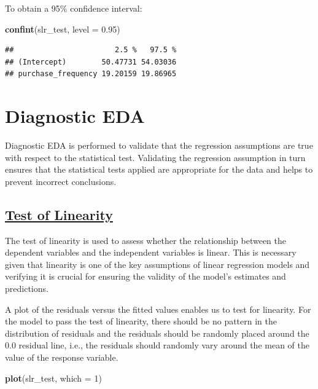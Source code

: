 \documentclass[
]{article}
\newenvironment{Shaded}{\begin{snugshade}}{\end{snugshade}}
\newcommand{\AttributeTok}[1]{\textcolor[rgb]{0.13,0.29,0.53}{#1}}
\newcommand{\DecValTok}[1]{\textcolor[rgb]{0.00,0.00,0.81}{#1}}
\newcommand{\FloatTok}[1]{\textcolor[rgb]{0.00,0.00,0.81}{#1}}
\newcommand{\FunctionTok}[1]{\textcolor[rgb]{0.13,0.29,0.53}{\textbf{#1}}}
\newcommand{\NormalTok}[1]{#1}
\begin{document}
To obtain a 95\% confidence interval:

\begin{Shaded}
\begin{Highlighting}[]
\FunctionTok{confint}\NormalTok{(slr\_test, }\AttributeTok{level =} \FloatTok{0.95}\NormalTok{)}
\end{Highlighting}
\end{Shaded}

\begin{verbatim}
##                       2.5 %   97.5 %
## (Intercept)        50.47731 54.03036
## purchase_frequency 19.20159 19.86965
\end{verbatim}

\section{Diagnostic EDA}\label{diagnostic-eda}

Diagnostic EDA is performed to validate that the regression assumptions
are true with respect to the statistical test. Validating the regression
assumption in turn ensures that the statistical tests applied are
appropriate for the data and helps to prevent incorrect conclusions.

\subsection{\texorpdfstring{\ul{\textbf{Test of
Linearity}}}{Test of Linearity}}\label{test-of-linearity}

The test of linearity is used to assess whether the relationship between
the dependent variables and the independent variables is linear. This is
necessary given that linearity is one of the key assumptions of linear
regression models and verifying it is crucial for ensuring the validity
of the model's estimates and predictions.

A plot of the residuals versus the fitted values enables us to test for
linearity. For the model to pass the test of linearity, there should be
no pattern in the distribution of residuals and the residuals should be
randomly placed around the 0.0 residual line, i.e., the residuals should
randomly vary around the mean of the value of the response variable.

\begin{Shaded}
\begin{Highlighting}[]
\FunctionTok{plot}\NormalTok{(slr\_test, }\AttributeTok{which =} \DecValTok{1}\NormalTok{)}
\end{Highlighting}
\end{Shaded}
\end{document}
